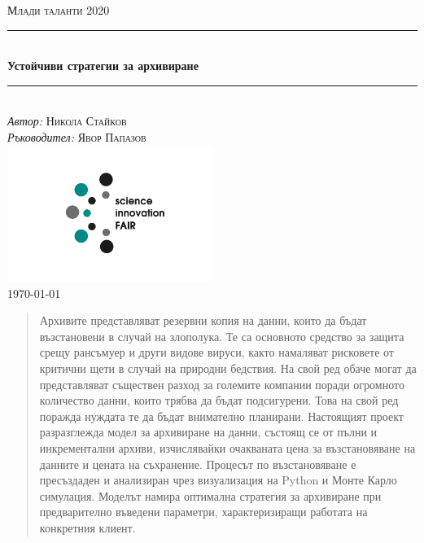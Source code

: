 \documentclass[11pt, a4paper]{article}
\theoremstyle{definition}
\begin{document}
\begin{titlepage}
	\newcommand{\HRule}{\rule{\linewidth}{0.5mm}}
	\centering
	\textsc{\LARGE Млади таланти 2020}\\[1cm]
	\HRule\\[1 cm]
	{\huge\bfseries Устойчиви стратегии за архивиране}\\[0.5 cm] 
	\HRule\\
	\vfill
	\Large
	\textit{Автор:}
	\textsc{Никола Стайков}\\
	\vspace{2cm}
	\Large
	\textit{Ръководител:}
	\textsc{Явор Папазов}\\
	\includegraphics[width=0.5\textwidth]{Innofair_logo.png}\\
	\vfill	
	{\large\today}   
	\vfill
\end{titlepage}

\tableofcontents
\newpage
\begin{abstract}
		Архивите представляват резервни копия на данни, които да бъдат възстановени в случай на злополука. Те са основното средство за защита срещу рансъмуер и други видове вируси, както намаляват рисковете от критични щети в случай на природни бедствия. На свой ред обаче могат да представляват съществен разход за големите компании поради огромното количество данни, които трябва да бъдат подсигурени. Това на свой ред поражда нуждата те да бъдат внимателно планирани. Настоящият проект разразглежда модел за архивиране на данни, състоящ се от пълни и инкрементални архиви, изчислявайки очакваната цена за възстановяване на данните и цената на съхранение. Процесът по възстановяване е пресъздаден и анализиран чрез визуализация на Python и Монте Карло симулация. Моделът намира оптимална стратегия за архивиране при предварително въведени параметри, характеризиращи работата на конкретния клиент.
\end{abstract}
\end{document}
